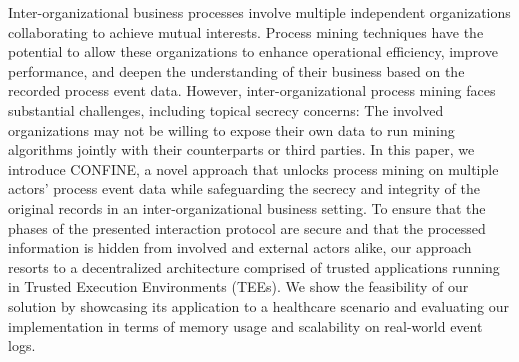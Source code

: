 Inter-organizational business processes involve multiple independent organizations collaborating to achieve mutual interests. 
Process mining techniques have the potential to allow these organizations to enhance operational efficiency, improve performance, and deepen the understanding of their business based on the recorded process event data. 
However, inter-organizational process mining faces substantial challenges, including topical secrecy concerns: The involved organizations may not be willing to expose their own data to run mining algorithms jointly with their counterparts or third parties. 
In this paper, we introduce CONFINE, a novel approach that unlocks process mining on multiple actors' process event data while safeguarding the secrecy and integrity of the original records in an inter-organizational business setting.
To ensure that the phases of the presented interaction protocol are secure and that the processed information is hidden from involved and external actors alike, our approach resorts to a decentralized architecture comprised of trusted applications running in Trusted Execution Environments (TEEs). We show the feasibility of our solution by showcasing its application to a healthcare scenario and evaluating our implementation in terms of memory usage and scalability on real-world event logs.


